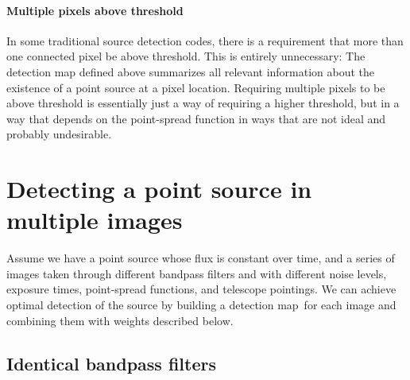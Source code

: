 \documentclass[letterpaper,preprint]{aastex}
\newcommand{\doctype}{paper}
\newcommand{\detmap}{detection map}
\begin{document}




\paragraph{Multiple pixels above threshold}
In some traditional source detection codes, there is a requirement
that more than one connected pixel be above threshold.  This is
entirely unnecessary: The detection map defined above summarizes all
relevant information about the existence of a point source at a pixel
location.  Requiring multiple pixels to be above threshold is
essentially just a way of requiring a higher threshold, but in a way
that depends on the point-spread function in ways that are not ideal
and probably undesirable.



\section{Detecting a point source in multiple images}

Assume we have a point source whose flux is constant over time, and a
series of images taken through different bandpass filters and with
different noise levels, exposure times, point-spread functions, and
telescope pointings.  We can achieve optimal detection of the source
by building a \detmap\ for each image and combining them with weights
described below.


\subsection{Identical bandpass filters}
\end{document}

